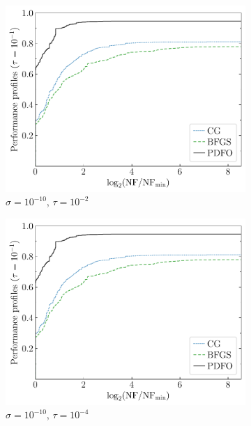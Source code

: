\documentclass[manuscript,screen,review]{acmart}
\numberwithin{equation}{section}
\begin{document}
\begin{figure}[htbp]
\begin{subfigure}{.48\textwidth}
        \centering
        \includegraphics[width=\textwidth,page=2]{perf-noisy-bfgs_cg_pdfo-50-10.pdf}
        \caption{$\sigma = 10^{-10}$, $\tau = 10^{-2}$}
    \end{subfigure}
    \hfill
    \begin{subfigure}{.48\textwidth}
        \centering
        \includegraphics[width=\textwidth,page=4]{perf-noisy-bfgs_cg_pdfo-50-10.pdf}
        \caption{$\sigma = 10^{-10}$, $\tau = 10^{-4}$}
    \end{subfigure}
    \hfill
    \begin{subfigure}{.48\textwidth}
        \centering

\end{subfigure}
\end{figure}
\end{document}
